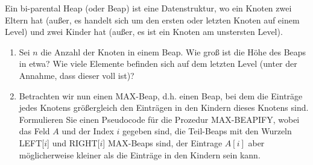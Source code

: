 
\begin{exercise}

Ein bi-parental Heap (oder Beap) ist eine Datenstruktur, wo ein Knoten zwei Eltern hat (außer, es handelt sich um den ersten oder letzten Knoten auf einem Level) und zwei Kinder hat (außer, es ist ein Knoten am unstersten Level).

\begin{enumerate}[label = \alph*)]

  \item Sei $n$ die Anzahl der Knoten in einem Beap.
  Wie groß ist die Höhe des Beaps in etwa?
  Wie viele Elemente befinden sich auf dem letzten Level (unter der Annahme, dass dieser voll ist)?

  \item Betrachten wir nun einen MAX-Beap, d.h. einen Beap, bei dem die Einträge jedes Knotens größergleich den Einträgen in den Kindern dieses Knotens sind.
  Formulieren Sie einen Pseudocode für die Prozedur MAX-BEAPIFY, wobei das Feld $A$ und der Index $i$ gegeben sind, die Teil-Beaps mit den Wurzeln LEFT[$i$] und RIGHT[$i$] MAX-Beaps sind, der Eintrage $A[i]$ aber möglicherweise kleiner als die Einträge in den Kindern sein kann.

\end{enumerate}

\end{exercise}



